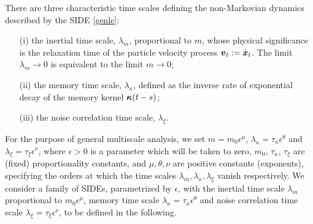 There are three characteristic time scales defining the non-Markovian dynamics described by the SIDE \eqref{genle}:
\begin{itemize}
\item[(i)] the inertial time scale, $\lambda_{m}$, proportional to $m$, whose physical significance is the relaxation time of the particle velocity process $\boldsymbol{v}_{t} := \dot{\boldsymbol{x}}_{t}$. The limit $\lambda_{m} \to 0$ is equivalent to the limit $m \to 0$; 
\item[(ii)] the memory time scale, $\lambda_{\kappa}$, defined as the inverse rate of exponential decay of the memory kernel $\boldsymbol{\kappa}(t-s)$;
\item[(iii)] the noise correlation time scale, $\lambda_{\xi}$.
\end{itemize}

For the purpose of general multiscale analysis, we set $m = m_{0} \epsilon^{\mu}$, $\lambda_{\kappa} = \tau_{\kappa}  \epsilon^{\theta}$ and $\lambda_{\xi} = \tau_{\xi} \epsilon^{\nu}$, 
 where $\epsilon > 0$ is a parameter which will be taken to zero, $m_0$, $\tau_\kappa$, $\tau_\xi$ are (fixed) proportionality constants, and $\mu, \theta, \nu$ are positive constants (exponents), specifying the orders at which the time scales $\lambda_{m}, \lambda_{\kappa}, \lambda_{\xi}$ vanish  respectively. We consider a family of SIDEs, parametrized by $\epsilon$, with the inertial time scale $\lambda_m$ proportional to $m_0 \epsilon^\mu$, memory time scale $\lambda_{\kappa} = \tau_\kappa \epsilon^\theta$ and noise correlation time scale $\lambda_{\xi} = \tau_{\xi} \epsilon^{\nu}$, to be defined in the following.

